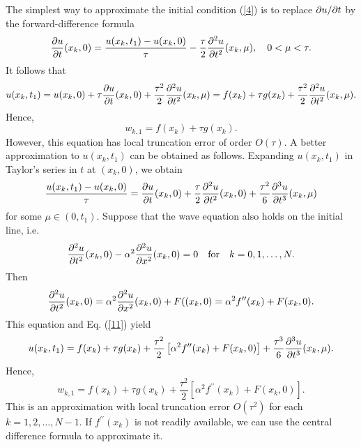 The simplest way to approximate the initial
condition (\ref{4}) is to replace ${\partial} u/{\partial} t$ by the
forward-difference formula
\[
\frac{{\partial} u}{{\partial}
t}(x_{k},0)=\frac{u(x_{k},t_{1})-u(x_{k},0)}{\tau}-
\frac{\tau}{2}\frac{{\partial}^{2} u}{{\partial} t^{2}}(x_{k}, \mu), \quad 0<\mu
< \tau.
\]
It follows that
\[
u(x_{k},t_{1})=u(x_{k},0)+\tau \frac{{\partial} u}{{\partial} t}(x_{k},0)+
\frac{\tau^{2}}{2}\frac{{\partial}^{2} u}{{\partial} t^{2}}(x_{k}, \mu)=
f(x_{k})+\tau g(x_{k})+ \frac{\tau^{2}}{2}\frac{{\partial}^{2} u}{{\partial}
t^{2}}(x_{k}, \mu).
\]
Hence,
\begin{equation}
w_{k,1}=f(x_{k})+\tau g(x_{k}). \label{10}
\end{equation}
However, this equation has local truncation error of order
$O(\tau)$. A better approximation to $u(x_{k},t_{1})$ can be
obtained as follows. Expanding $u(x_{k},t_{1})$ in Taylor's series
in $t$ at $(x_{k},0)$, we obtain
\begin{equation}
\frac{u(x_{k},t_{1})-u(x_{k},0)}{\tau}=\frac{{\partial} u}{{\partial}
t}(x_{k},0)+ \frac{\tau}{2}\frac{{\partial}^{2} u}{{\partial} t^{2}}(x_{k},0)+
\frac{\tau^{2}}{6}\frac{{\partial}^{3} u}{{\partial} t^{3}}(x_{k}, \mu)
\label{11}
\end{equation}
for some $\mu\in(0,t_{1})$. Suppose that the wave equation also
holds on the initial line, i.e.
\[
\frac{{\partial}^{2} u}{{\partial} t^{2}}(x_{k},0) - \alpha^{2}\frac{{\partial}^{2}
u}{{\partial} x^{2}}(x_{k},0)=0 \quad \hbox{for} \quad k=0,1, \dots, N.
\]
Then
\[
\frac{{\partial}^{2} u}{{\partial} t^{2}}(x_{k},0) = \alpha^{2}\frac{{\partial}^{2}
u}{{\partial} x^{2}}(x_{k},0)+F((x_{k},0)=
\alpha^{2}f^{\prime\prime}(x_{k})+F(x_{k},0).
\]
This equation and Eq. (\ref{11}) yield
\[
u(x_{k},t_{1})=f(x_{k})+\tau g(x_{k})+
\frac{\tau^{2}}{2}\left[\alpha^{2}f^{\prime\prime}(x_{k})+F(x_{k},0)\right]+
\frac{\tau^{3}}{6}\frac{{\partial}^{3} u}{{\partial} t^{3}}(x_{k}, \mu).
\]
Hence,
\begin{equation}
w_{k,1}=f(x_{k})+\tau g(x_{k})+
\frac{\tau^{2}}{2}\left[\alpha^{2}f^{\prime\prime}(x_{k})+F(x_{k},0)\right].
\label{12}
\end{equation}
This is an approximation with local truncation error $O(\tau^{2})$
for each $k=1, 2, \dots, N-1$. If $f^{\prime\prime}(x_{k})$ is not
readily available, we can use the central difference formula to
approximate it.
   
